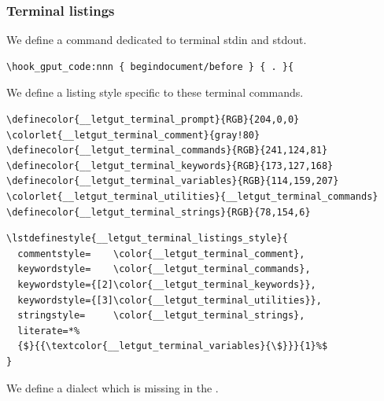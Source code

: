 \documentclass{letgut}
\begin{document}
\subsubsection{Terminal listings}
\label{ImplementationListingsTerminallistings-fq5h55h0jlj0}
We define a command dedicated to terminal stdin and stdout.

\begin{lstlisting}
\hook_gput_code:nnn { begindocument/before } { . }{
\end{lstlisting}

We define a listing style specific to these terminal commands.

\begin{lstlisting}
\definecolor{__letgut_terminal_prompt}{RGB}{204,0,0}
\colorlet{__letgut_terminal_comment}{gray!80}
\definecolor{__letgut_terminal_commands}{RGB}{241,124,81}
\definecolor{__letgut_terminal_keywords}{RGB}{173,127,168}
\definecolor{__letgut_terminal_variables}{RGB}{114,159,207}
\colorlet{__letgut_terminal_utilities}{__letgut_terminal_commands}
\definecolor{__letgut_terminal_strings}{RGB}{78,154,6}
\end{lstlisting}

\begin{lstlisting}
\lstdefinestyle{__letgut_terminal_listings_style}{
  commentstyle=    \color{__letgut_terminal_comment},
  keywordstyle=    \color{__letgut_terminal_commands},
  keywordstyle={[2]\color{__letgut_terminal_keywords}},
  keywordstyle={[3]\color{__letgut_terminal_utilities}},
  stringstyle=     \color{__letgut_terminal_strings},
  literate=*%
  {$}{{\textcolor{__letgut_terminal_variables}{\$}}}{1}%$
}
\end{lstlisting}

We define a dialect which is missing in the .
\end{document}
